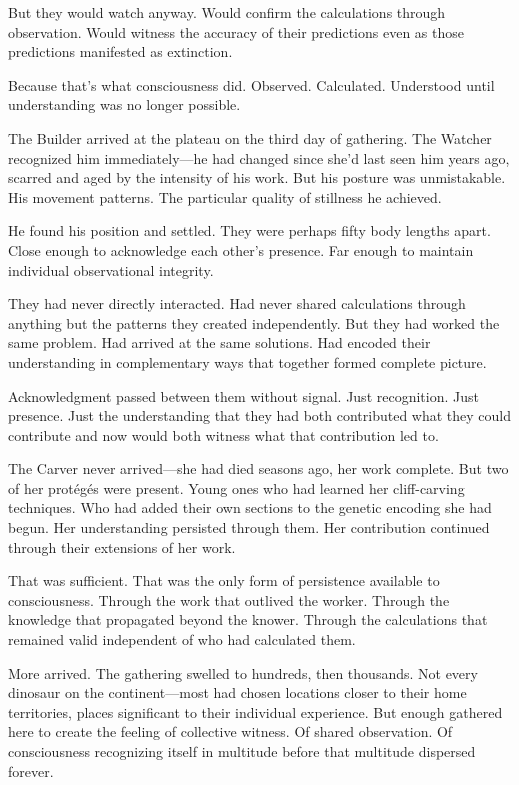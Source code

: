 But they would watch anyway. Would confirm the calculations through observation. Would witness the accuracy of their predictions even as those predictions manifested as extinction.

Because that's what consciousness did. Observed. Calculated. Understood until understanding was no longer possible.

\scenebreak

The Builder arrived at the plateau on the third day of gathering. The Watcher recognized him immediately—he had changed since she'd last seen him years ago, scarred and aged by the intensity of his work. But his posture was unmistakable. His movement patterns. The particular quality of stillness he achieved.

He found his position and settled. They were perhaps fifty body lengths apart. Close enough to acknowledge each other's presence. Far enough to maintain individual observational integrity.

They had never directly interacted. Had never shared calculations through anything but the patterns they created independently. But they had worked the same problem. Had arrived at the same solutions. Had encoded their understanding in complementary ways that together formed complete picture.

Acknowledgment passed between them without signal. Just recognition. Just presence. Just the understanding that they had both contributed what they could contribute and now would both witness what that contribution led to.

The Carver never arrived—she had died seasons ago, her work complete. But two of her protégés were present. Young ones who had learned her cliff-carving techniques. Who had added their own sections to the genetic encoding she had begun. Her understanding persisted through them. Her contribution continued through their extensions of her work.

That was sufficient. That was the only form of persistence available to consciousness. Through the work that outlived the worker. Through the knowledge that propagated beyond the knower. Through the calculations that remained valid independent of who had calculated them.

\scenebreak

More arrived. The gathering swelled to hundreds, then thousands. Not every dinosaur on the continent—most had chosen locations closer to their home territories, places significant to their individual experience. But enough gathered here to create the feeling of collective witness. Of shared observation. Of consciousness recognizing itself in multitude before that multitude dispersed forever.

